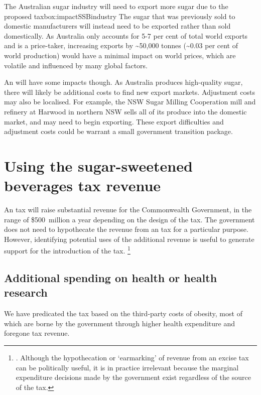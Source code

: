 \documentclass[embargoed]{grattan}
\begin{document}
\begin{bigbox*}{The Australian sugar industry will need to export more sugar due to the proposed \SSB{} tax}{box:impactSSBindustry}
The sugar that was previously sold to domestic \SSB{} manufacturers will instead need to be exported rather than sold domestically.
As Australia only accounts for 5-7 per cent of total world exports and is a price-taker, increasing exports by \textasciitilde{}50,000 tonnes (\textasciitilde{}0.03 per cent of world production) would have a minimal impact on world prices, which are volatile and influenced by many global factors. 

An \SSB{} will have some impacts though.
As Australia produces high-quality sugar, there will likely be additional costs to find new export markets.
Adjustment costs may also be localised.
For example, the NSW Sugar Milling Cooperation mill and refinery at Harwood in northern NSW sells all of its produce into the domestic market, and may need to begin exporting.
These export difficulties and adjustment costs could be warrant a small government transition package.
\end{bigbox*}

\chapter{Using the sugar-sweetened beverages tax revenue }\label{using-the-sugar-sweetened-beverages-tax-revenue}

An \SSB{} tax will raise substantial revenue for the Commonwealth Government, in the range of \$500~million a year depending on the design of the tax.
The government does not need to hypothecate the revenue from an \SSB{} tax for a particular purpose.
However, identifying potential uses of the additional revenue is useful to generate support for the introduction of the tax.%
\footnote{\textcites{Freebairn2010Taxationobesity}{Organization2016FiscalPoliciesDiet}{CnossenExcisetaxationAustralia}.
Although the hypothecation or `earmarking' of revenue from an excise tax can be politically useful, it is in practice irrelevant because the marginal expenditure decisions made by the government exist regardless of the source of the tax.}

\section{Additional spending on health or health research}\label{additional-spending-on-health-or-health-research}

We have predicated the \SSB{} tax based on the third-party costs of obesity, most of which are borne by the government through higher health expenditure and foregone tax revenue.
\end{document}
